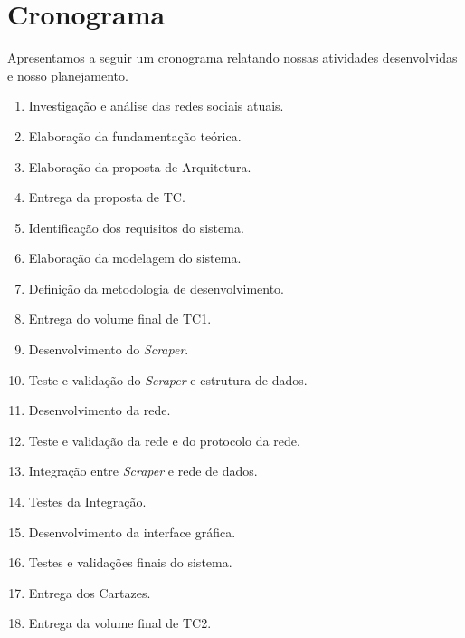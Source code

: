 \chapter{Cronograma}

Apresentamos a seguir um cronograma relatando nossas atividades desenvolvidas e nosso planejamento.

\begin{enumerate}
    \item \label{cron:search} Investigação e análise das redes sociais atuais.
    \item \label{cron:background} Elaboração da fundamentação teórica.
    \item \label{cron:architecture} Elaboração da proposta de Arquitetura.
	\item \label{cron:proposal} Entrega da proposta de TC.
	\item \label{cron:requirements} Identificação dos requisitos do sistema.
	\item \label{cron:diagrams} Elaboração da modelagem do sistema.
	\item \label{cron:methodology} Definição da metodologia de desenvolvimento.
	\item \label{cron:esc-tcI}  Entrega do volume final de TC1.
	\item \label{cron:scraper} Desenvolvimento do \textit{Scraper}.
	\item \label{cron:val1}  Teste e validação do \textit{Scraper} e estrutura de dados. 
	\item \label{cron:network} Desenvolvimento da rede.
	\item \label{cron:val2} Teste e validação da rede e do protocolo da rede.
	\item \label{cron:integration} Integração entre \textit{Scraper} e rede de dados.
	\item \label{cron:val3} Testes da Integração.
	\item \label{cron:gui} Desenvolvimento da interface gráfica.
	\item \label{cron:val4} Testes e validações finais do sistema.
	\item \label{cron:poster} Entrega dos Cartazes.
	\item \label{cron:esc-tcII} Entrega da volume final de TC2.
\end{enumerate}

